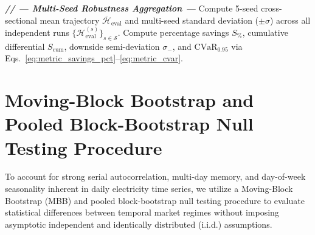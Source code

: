 \begin{algorithm*}[t]
\begin{algorithmic}[1]
\Statex
\Statex \textbf{\textit{// --- Multi-Seed Robustness Aggregation ---}}
\State Compute 5-seed cross-sectional mean trajectory $\overline{\mathcal{H}}_{\text{eval}}$ and multi-seed standard deviation ($\pm \sigma$) across all independent runs $\{\mathcal{H}_{\text{eval}}^{(s)}\}_{s \in \mathcal{S}}$.
\State Compute percentage savings $S_{\%}$, cumulative differential $S_{\text{cum}}$, downside semi-deviation $\sigma_-$, and $\text{CVaR}_{0.95}$ via Eqs.~\eqref{eq:metric_savings_pct}--\eqref{eq:metric_cvar}.
\end{algorithmic}
\end{algorithm*}

\clearpage

\section{Moving-Block Bootstrap and Pooled Block-Bootstrap Null Testing Procedure}
\label{app:block_bootstrap}

To account for strong serial autocorrelation, multi-day memory, and day-of-week seasonality inherent in daily electricity time series, we utilize a Moving-Block Bootstrap (MBB) and pooled block-bootstrap null testing procedure \cite{kunsch1989jackknife, politis1994stationary} to evaluate statistical differences between temporal market regimes without imposing asymptotic independent and identically distributed (i.i.d.) assumptions.

